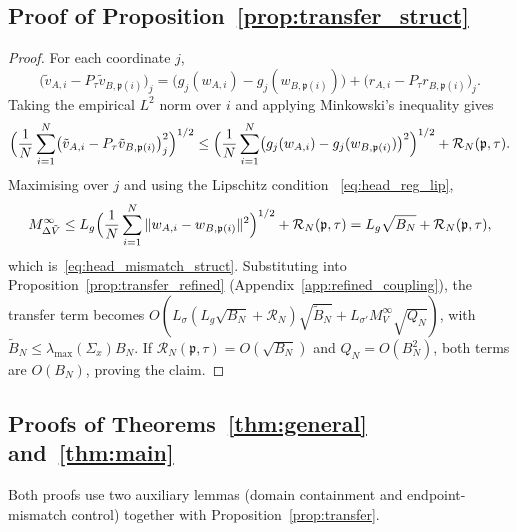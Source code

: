 \documentclass[11pt]{article}
\newcommand{\nperm}{\mathfrak{p}}  %
\begin{document}
\subsection{Proof of Proposition~\ref{prop:transfer_struct}}
\begin{proof}
For each coordinate $j$,
\[
  \bigl(\tilde v_{A,i} - P_\tau \tilde v_{B,\nperm(i)}\bigr)_j
  =
  \bigl(g_j(w_{A,i}) - g_j(w_{B,\nperm(i)})\bigr)
  + \bigl(r_{A,i} - P_\tau r_{B,\nperm(i)}\bigr)_j.
\]
Taking the empirical $L^2$ norm over $i$ and applying Minkowski's
inequality gives
\[
  \Bigl(
    \frac{1}{N}\sum_{i=1}^N
    \bigl(\tilde v_{A,i} - P_\tau \tilde v_{B,\nperm(i)}\bigr)_j^2
  \Bigr)^{1/2}
  \le
  \Bigl(
    \frac{1}{N}\sum_{i=1}^N
    \bigl(g_j(w_{A,i}) - g_j(w_{B,\nperm(i)})\bigr)^2
  \Bigr)^{1/2}
  + \mathcal R_N(\nperm,\tau).
\]
Maximising over $j$ and using the Lipschitz condition
~\eqref{eq:head_reg_lip},
\[
  M_{\Delta \tilde V}^\infty
  \le
  L_g \Bigl(\frac{1}{N}\sum_{i=1}^N
    \|w_{A,i} - w_{B,\nperm(i)}\|^2\Bigr)^{1/2}
  + \mathcal R_N(\nperm,\tau)
  = L_g \sqrt{B_N} + \mathcal R_N(\nperm,\tau),
\]
which is~\eqref{eq:head_mismatch_struct}.
Substituting into Proposition~\ref{prop:transfer_refined}
(Appendix~\ref{app:refined_coupling}),
the transfer term becomes
$O(L_\sigma(L_g\sqrt{B_N}+\mathcal R_N)\sqrt{\tilde B_N}
+ L_{\sigma'} M_V^\infty \sqrt{Q_N})$,
with $\tilde B_N \le \lambda_{\max}(\Sigma_x) B_N$.
If $\mathcal R_N(\nperm,\tau) = O(\sqrt{B_N})$ and
$Q_N = O(B_N^2)$, both terms are $O(B_N)$, proving the claim.
\end{proof}

\subsection{Proofs of Theorems~\ref{thm:general} and~\ref{thm:main}}\label{sec:proof_main}

Both proofs use two auxiliary lemmas
(domain containment and endpoint-mismatch control)
together with Proposition~\ref{prop:transfer}.
\end{document}
